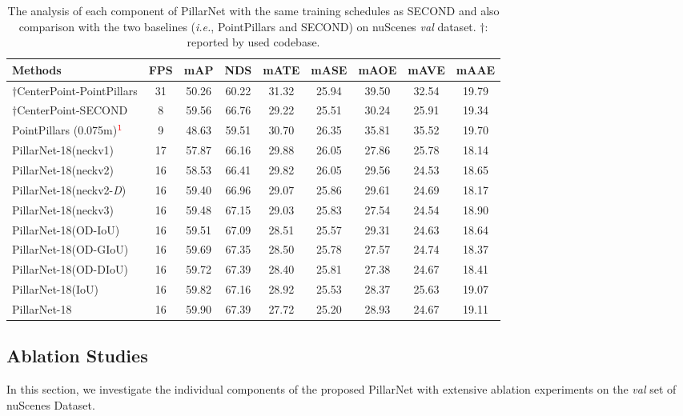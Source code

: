 \documentclass[runningheads]{llncs}
\begin{document}
\begin{table}[t]
\centering
\caption{The analysis of each component of PillarNet with the same training schedules as SECOND and also comparison with the two baselines (\textit{i.e.}, PointPillars and SECOND) on nuScenes \textit{val} dataset. $\dagger$: reported by used codebase.}
\label{tab:ab_compare}
\begin{tabular}{l|c|cc|ccccc} 
\hline\noalign{\smallskip}
Methods & FPS & mAP & NDS & mATE & mASE & mAOE & mAVE & mAAE  \\ \hline
$\dagger$CenterPoint-PointPillars \cite{lang2019pointpillars} & 31 & 50.26 & 60.22 & 31.32 & 25.94 & 39.50 & 32.54 & 19.79 \\
$\dagger$CenterPoint-SECOND \cite{yan2018second} & 8 & 59.56 & 66.76 & 29.22 & 25.51 & 30.24 & 25.91 & 19.34 \\
PointPillars (0.075m)$^{\textcolor{red}{1}}$ & 9 & 48.63 & 59.51 & 30.70 & 26.35 & 35.81 & 35.52 & 19.70 \\
\noalign{\smallskip}
\hline
\noalign{\smallskip}
PillarNet-18(neckv1) & 17 & 57.87 & 66.16 & 29.88 & 26.05 & 27.86 & 25.78 & 18.14 \\
PillarNet-18(neckv2) & 16 & 58.53 & 66.41 & 29.82 & 26.05 & 29.56 & 24.53 & 18.65 \\ 
PillarNet-18(neckv2-\textit{D}) & 16 & 59.40 & 66.96 & 29.07 & 25.86 & 29.61 & 24.69 & 18.17 \\
PillarNet-18(neckv3) & 16 & 59.48 & 67.15 & 29.03 & 25.83 & 27.54 & 24.54 & 18.90 \\
\hline
PillarNet-18(OD-IoU) & 16 & 59.51 & 67.09 & 28.51 & 25.57 & 29.31 & 24.63 & 18.64  \\
PillarNet-18(OD-GIoU) & 16 & 59.69 & 67.35 & 28.50 & 25.78 & 27.57 & 24.74 & 18.37 \\
PillarNet-18(OD-DIoU) & 16 & 59.72 & 67.39 & 28.40 & 25.81 & 27.38 & 24.67 & 18.41 \\
PillarNet-18(IoU) & 16 & 59.82 & 67.16 & 28.92 & 25.53 & 28.37 & 25.63 & 19.07 \\ \hline
PillarNet-18 & 16 & 59.90 & 67.39 & 27.72 & 25.20 & 28.93 & 24.67 & 19.11 \\
\hline
\end{tabular}
\end{table}


\subsection{Ablation Studies}

In this section, we investigate the individual components of the proposed PillarNet with extensive ablation experiments on the \textit{val} set of nuScenes Dataset.
\end{document}
